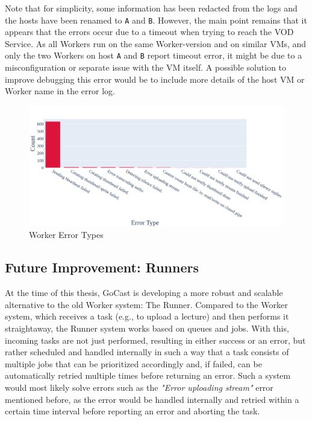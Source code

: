 \noindent Note that for simplicity, some information has been redacted from the logs and the hosts have been renamed to \texttt{A} and \texttt{B}. However, the main point remains that it appears that the errors occur due to a timeout when trying to reach the VOD Service. As all Workers run on the same Worker-version and on similar \ac{VM}s, and only the two Workers on host \texttt{A} and \texttt{B} report timeout error, it might be due to a misconfiguration or separate issue with the \ac{VM} itself. A possible solution to improve debugging this error would be to include more details of the host \ac{VM} or Worker name in the error log. 

\begin{figure}[htpb]
    \centering
    \includegraphics[width=\linewidth]{images/plots/worker/error_types.png}
    \caption[Worker Error Types]{Worker Error Types}\label{fig:worker-error-types}
\end{figure}

\subsection{Future Improvement: Runners}\label{subsection:runner}

At the time of this thesis, GoCast is developing a more robust and scalable alternative to the old Worker system: The Runner. Compared to the Worker system, which receives a task (e.g., to upload a lecture) and then performs it straightaway, the Runner system works based on queues and jobs. With this, incoming tasks are not just performed, resulting in either success or an error, but rather scheduled and handled internally in such a way that a task consists of multiple jobs that can be prioritized accordingly and, if failed, can be automatically retried multiple times before returning an error. Such a system would most likely solve errors such as the \textit{"Error uploading stream"} error mentioned before, as the error would be handled internally and retried within a certain time interval before reporting an error and aborting the task.

